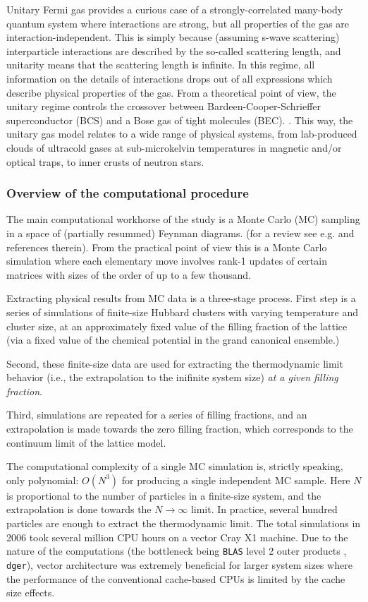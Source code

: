 
Unitary Fermi gas provides a curious case of a strongly-correlated many-body
quantum system where interactions are strong, but all properties of the gas are
interaction-independent. This is simply because (assuming s-wave scattering)
interparticle interactions are described by the so-called scattering length, 
and unitarity means that the scattering length is infinite. In this regime, all
information on the details of interactions drops out of all expressions which 
describe physical properties of the gas. From a theoretical point of view, the unitary regime controls
the crossover between Bardeen-Cooper-Schrieffer superconductor (BCS) and a Bose
gas of tight molecules (BEC). \cite{Eagles:1969, Legett:1980}. 
This way, the unitary gas model relates
to a wide range of physical systems, from lab-produced clouds of ultracold gases at
sub-microkelvin temperatures in magnetic and/or optical traps, to inner crusts of
neutron stars.

\subsubsection{Overview of the computational procedure}

The main computational workhorse of the study \cite{PRL:2006, NJP:2006} is a
Monte Carlo (MC) sampling in a space of (partially resummed) Feynman diagrams. 
(for a review see e.g. \cite{Gull:2011} and references therein). From the
practical point of view this is a Monte Carlo simulation where each elementary
move involves rank-1 updates of certain matrices with sizes of the order of up to
 a few thousand.

Extracting physical results from MC data is a three-stage process. First step is
a series of simulations of finite-size Hubbard clusters with varying temperature
and cluster size, at an approximately fixed value of the filling fraction of the lattice 
(via a fixed value of the chemical potential in the grand canonical ensemble.)

Second, these finite-size data are used for extracting the thermodynamic limit behavior
(i.e., the extrapolation to the inifinite system size) \emph{at a given filling fraction}.

Third, simulations are repeated for a series of filling fractions, and an
extrapolation is made towards the zero filling fraction, which corresponds to 
the continuum limit of the lattice model.

The computational complexity of a single MC simulation is, strictly speaking,
only polynomial: $O(N^3)$ for producing a single independent MC sample. Here $N$ is
proportional to the number of particles in a finite-size system, and the extrapolation
is done towards the $N\to\infty$ limit. In practice, several hundred particles are
enough to extract the thermodynamic limit.
The total simulations in 2006 took several million CPU hours on a vector Cray X1 machine.
Due to the nature of the computations (the bottleneck being
\texttt{BLAS} level 2  outer products , \texttt{dger}), vector architecture was
extremely beneficial for larger system sizes where the performance of the 
conventional cache-based CPUs is limited by the cache size effects.


